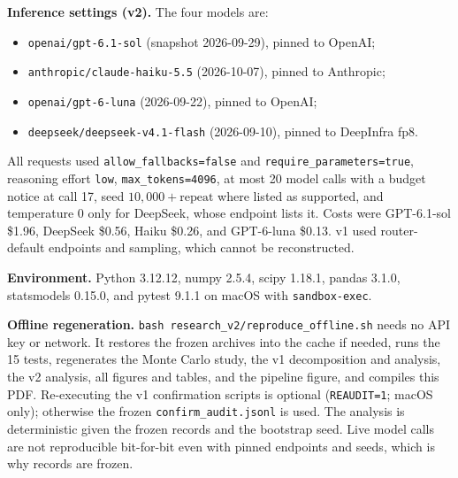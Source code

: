 \textbf{Inference settings (v2).} The four models are:
\begin{itemize}
\item \texttt{openai/gpt-6.1-sol} (snapshot 2026-09-29), pinned to OpenAI;
\item \texttt{anthropic/claude-haiku-5.5} (2026-10-07), pinned to Anthropic;
\item \texttt{openai/gpt-6-luna} (2026-09-22), pinned to OpenAI;
\item \texttt{deepseek/deepseek-v4.1-flash} (2026-09-10), pinned to DeepInfra
fp8.
\end{itemize}
All requests used \texttt{allow\_fallbacks=false} and
\texttt{require\_parameters=true}, reasoning effort \texttt{low},
\texttt{max\_tokens=4096}, at most 20 model calls with a budget notice at call
17, seed $10{,}000+\text{repeat}$ where listed as supported, and temperature
0 only for DeepSeek, whose endpoint lists it. Costs were GPT-6.1-sol \$1.96,
DeepSeek \$0.56, Haiku \$0.26, and GPT-6-luna \$0.13. v1 used router-default
endpoints and sampling, which cannot be reconstructed.

\textbf{Environment.} Python 3.12.12, numpy 2.5.4, scipy 1.18.1, pandas
3.1.0, statsmodels 0.15.0, and pytest 9.1.1 on macOS with
\texttt{sandbox-exec}.

\textbf{Offline regeneration.} \texttt{bash research\_v2/reproduce\_offline.sh}
needs no API key or network. It restores the frozen archives into the cache
if needed, runs the 15 tests, regenerates the Monte Carlo study, the v1
decomposition and analysis, the v2 analysis, all figures and tables, and the
pipeline figure, and compiles this PDF. Re-executing the v1 confirmation
scripts is optional (\texttt{REAUDIT=1}; macOS only); otherwise the frozen
\texttt{confirm\_audit.jsonl} is used. The analysis is deterministic given
the frozen records and the bootstrap seed. Live model calls are not
reproducible bit-for-bit even with pinned endpoints and seeds, which is why
records are frozen.

